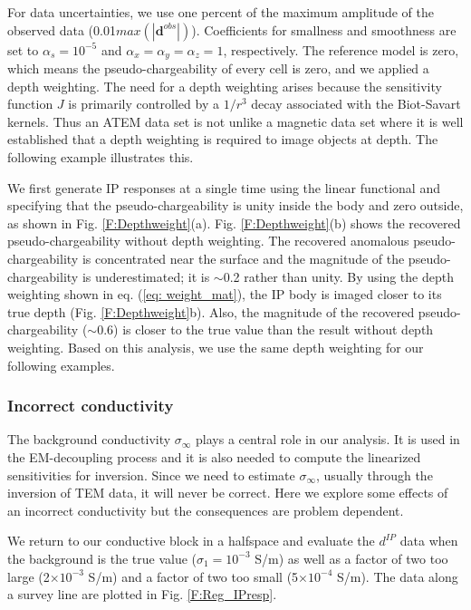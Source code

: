 \documentclass[extra,mreferee]{gji}
\newcommand{\siginf}{\sigma_\infty}
\newcommand{\dip}{d^{IP}}
\begin{document}
For data uncertainties, we use one percent of the maximum amplitude of the observed data (0.01$max(|\mathbf{d}^{obs}|)$). Coefficients for smallness and smoothness are set to $\alpha_s=10^{-5}$ and $\alpha_x=\alpha_y=\alpha_z=1$, respectively. The reference model is zero, which means the pseudo-chargeability of every cell is zero, and we applied a depth weighting.
The need for a depth weighting arises because the sensitivity function $J$ is primarily controlled by a $1/r^3$ decay associated with the Biot-Savart kernels.  Thus an ATEM data set is not unlike a magnetic data set where it is well established that a depth weighting is required to image objects at depth. The following example illustrates this.

We first generate IP responses at a single time using the linear functional and specifying that the pseudo-chargeability is unity inside the body and zero outside, as shown in  Fig. \ref{F:Depthweight}(a).
Fig. \ref{F:Depthweight}(b) shows the recovered pseudo-chargeability without depth weighting.
The recovered anomalous pseudo-chargeability is concentrated  near the surface and the magnitude of the pseudo-chargeability is underestimated; it is $\sim$0.2 rather than unity.
By using the depth weighting shown in eq. (\ref{eq: weight_mat}),  the IP body is imaged closer to its true depth (Fig. \ref{F:Depthweight}b).
Also, the magnitude of the recovered pseudo-chargeability ($\sim$0.6) is closer to the true value than the result without depth weighting.
Based on this analysis, we use the same depth weighting for our  following examples.

\subsubsection{Incorrect conductivity}
\label{subsubsection: Incorrect conductivity}
The background conductivity $\siginf$ plays a central role in our analysis. It is used in the EM-decoupling process and it is also needed to compute the linearized sensitivities for inversion. Since we need to estimate $\siginf$, usually through the inversion of TEM data, it will never be correct. Here we explore some effects of an incorrect conductivity but  the consequences are problem dependent.

We return to our conductive block in a halfspace and evaluate the $\dip$ data when the background is the true value ($\sigma_1 = 10^{-3}$ S/m) as well as a factor of two too large (2$\times10^{-3}$ S/m) and a factor of two too small (5$\times10^{-4}$ S/m). The data along a survey line are plotted in Fig. \ref{F:Reg_IPresp}.
\end{document}
